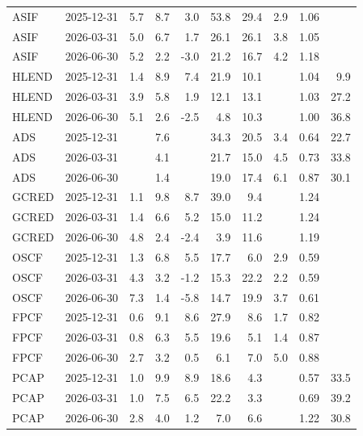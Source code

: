 \documentclass[12pt]{standalone}
\begin{document}
\begin{tabular}{llrrrrrrrr}
ASIF & 2025-12-31 & 5.7 & 8.7 & 3.0 & 53.8 & 29.4 & 2.9 & 1.06 &  \\
ASIF & 2026-03-31 & 5.0 & 6.7 & 1.7 & 26.1 & 26.1 & 3.8 & 1.05 &  \\
ASIF & 2026-06-30 & 5.2 & 2.2 & -3.0 & 21.2 & 16.7 & 4.2 & 1.18 &  \\
HLEND & 2025-12-31 & 1.4 & 8.9 & 7.4 & 21.9 & 10.1 &  & 1.04 & 9.9 \\
HLEND & 2026-03-31 & 3.9 & 5.8 & 1.9 & 12.1 & 13.1 &  & 1.03 & 27.2 \\
HLEND & 2026-06-30 & 5.1 & 2.6 & -2.5 & 4.8 & 10.3 &  & 1.00 & 36.8 \\
ADS & 2025-12-31 &  & 7.6 &  & 34.3 & 20.5 & 3.4 & 0.64 & 22.7 \\
ADS & 2026-03-31 &  & 4.1 &  & 21.7 & 15.0 & 4.5 & 0.73 & 33.8 \\
ADS & 2026-06-30 &  & 1.4 &  & 19.0 & 17.4 & 6.1 & 0.87 & 30.1 \\
GCRED & 2025-12-31 & 1.1 & 9.8 & 8.7 & 39.0 & 9.4 &  & 1.24 &  \\
GCRED & 2026-03-31 & 1.4 & 6.6 & 5.2 & 15.0 & 11.2 &  & 1.24 &  \\
GCRED & 2026-06-30 & 4.8 & 2.4 & -2.4 & 3.9 & 11.6 &  & 1.19 &  \\
OSCF & 2025-12-31 & 1.3 & 6.8 & 5.5 & 17.7 & 6.0 & 2.9 & 0.59 &  \\
OSCF & 2026-03-31 & 4.3 & 3.2 & -1.2 & 15.3 & 22.2 & 2.2 & 0.59 &  \\
OSCF & 2026-06-30 & 7.3 & 1.4 & -5.8 & 14.7 & 19.9 & 3.7 & 0.61 &  \\
FPCF & 2025-12-31 & 0.6 & 9.1 & 8.6 & 27.9 & 8.6 & 1.7 & 0.82 &  \\
FPCF & 2026-03-31 & 0.8 & 6.3 & 5.5 & 19.6 & 5.1 & 1.4 & 0.87 &  \\
FPCF & 2026-06-30 & 2.7 & 3.2 & 0.5 & 6.1 & 7.0 & 5.0 & 0.88 &  \\
PCAP & 2025-12-31 & 1.0 & 9.9 & 8.9 & 18.6 & 4.3 &  & 0.57 & 33.5 \\
PCAP & 2026-03-31 & 1.0 & 7.5 & 6.5 & 22.2 & 3.3 &  & 0.69 & 39.2 \\
PCAP & 2026-06-30 & 2.8 & 4.0 & 1.2 & 7.0 & 6.6 &  & 1.22 & 30.8 \\
\bottomrule\end{tabular}
\end{document}
